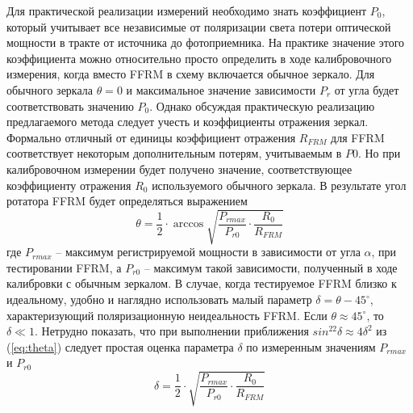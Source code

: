 \documentclass{article}
\begin{document}
Для практической реализации измерений необходимо знать коэффициент $P_0$, который учитывает все независимые от поляризации света потери оптической мощности в тракте от источника до фотоприемника.
На практике значение этого коэффициента можно относительно просто определить в ходе калибровочного измерения, когда вместо FFRM в схему включается обычное зеркало.
Для обычного зеркала $\theta = 0$ и максимальное значение зависимости $P_r$ от угла будет соответствовать значению $P_0$.
Однако обсуждая практическую реализацию предлагаемого метода следует учесть и коэффициенты отражения зеркал.
Формально отличный от единицы коэффициент отражения $R_{FRM}$ для FFRM соответствует некоторым дополнительным потерям, учитываемым в $P0$.
Но при калибровочном измерении будет получено значение, соответствующее коэффициенту отражения $R_0$ используемого обычного зеркала.
В результате угол ротатора FFRM будет определяться выражением
\begin{equation}
    \label{eq:theta}
    \theta =\frac{1}{2}\cdot\arccos\sqrt{\frac{P_{rmax}}{P_{r0}}\cdot\frac{R_0}{R_{FRM}}}
\end{equation}
где $P_{rmax}$ – максимум регистрируемой мощности в зависимости от угла $\alpha$, при тестировании FFRM, а $P_{r0}$ – максимум такой зависимости, полученный в ходе калибровки с обычным зеркалом.    
В случае, когда тестируемое FFRM близко к идеальному, удобно и наглядно использовать малый параметр $\delta = \theta - 45^\circ$, характеризующий поляризационную неидеальность FFRM.
Если $\theta \approx 45^\circ$, то $ \delta \ll 1$.
Нетрудно показать, что при выполнении приближения $sin^22\delta \approx 4\delta^2$ из (\ref{eq:theta}) следует простая оценка параметра $\delta$ по измеренным значениям $P_{rmax}$ и $P_{r0}$
\begin{equation}
    \label{eq:delta}
    \delta =\frac{1}{2}\cdot\sqrt{\frac{P_{rmax}}{P_{r0}}\cdot\frac{R_0}{R_{FRM}}}
\end{equation}
\end{document}
